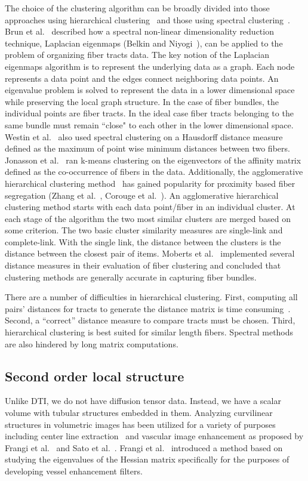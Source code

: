 The choice of the clustering algorithm can be broadly divided into those approaches using hierarchical clustering~\cite{Moberts2005, Zhang2008} and those using spectral clustering~\cite{Brun2004,jonasson2005, ODonnell2007}.
Brun et al.~\cite{Brun2003} described how a spectral non-linear dimensionality reduction technique, Laplacian eigenmaps (Belkin and Niyogi~\cite{Belkin01}), can be applied to the problem of organizing fiber tracts data. The key notion of the Laplacian eigenmaps algorithm is to represent the underlying data as a graph. Each node represents a data point and the edges connect neighboring data points. An eigenvalue problem is solved to represent the data in a lower dimensional space while preserving the local graph structure. In the case of fiber bundles, the individual points are fiber tracts. In the ideal case fiber tracts belonging to the same bundle must remain ``close" to each other in the lower dimensional space. Westin et al.~\cite{westinMEDIA02} also used spectral clustering on a Hausdorff distance measure defined as the maximum of point wise minimum distances between two fibers. Jonasson et al.~\cite{jonasson2005} ran k-means clustering on the eigenvectors of the affinity matrix defined as the co-occurrence of fibers in the data.
Additionally, the agglomerative hierarchical clustering method~\cite{DudaHartStork01} has gained popularity for proximity based fiber segregation (Zhang et al.~\cite{Zhang2008}, Corouge et al.~\cite{Corouge2004}). 
An agglomerative hierarchical clustering method starts with each data point/fiber in an individual cluster. At each stage of the algorithm the two most similar clusters are merged based on some criterion. The two basic cluster similarity measures are single-link and complete-link. With the single link, the distance between the clusters is the distance between the closest pair of items. 
Moberts et al.~\cite{Moberts2005} implemented several distance measures in their evaluation of fiber clustering and concluded that clustering methods are generally accurate in capturing fiber bundles. 
 
There are a number of difficulties in hierarchical clustering. First, computing all pairs' distances for tracts to generate the distance matrix is time consuming~\cite{Garyfallidis2012}. Second, a ``correct'' distance measure to compare tracts must be chosen. Third, hierarchical clustering is best suited for similar length fibers.
Spectral methods are also hindered by long matrix computations.


\subsection{Second order local structure}
Unlike DTI, we do not have diffusion tensor data. Instead, we have a scalar volume with tubular structures embedded in them. Analyzing curvilinear structures in volumetric images has been utilized for a variety of purposes including center line extraction~\cite{Bouix2005} and vascular image enhancement as proposed by Frangi et al.~\cite{Frangi1998} and Sato et al.~\cite{Sato1997}. Frangi et al.~\cite{Frangi1998} introduced a method based on studying the eigenvalues of the Hessian matrix specifically for the purposes of developing vessel enhancement filters.

